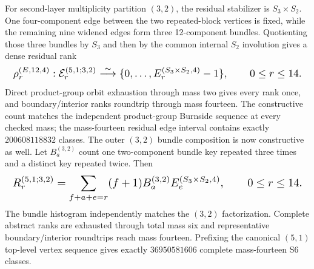 \documentclass{article}
\newcommand{\fitmath}[1]{\resizebox{0.99\linewidth}{!}{$\displaystyle #1$}}
\begin{document}
For second-layer multiplicity partition $(3,2)$, the residual stabilizer is
$S_3\times S_2$. One four-component edge between the two repeated-block
vertices is fixed, while the remaining nine widened edges form three
12-component bundles. Quotienting those three bundles by $S_3$ and then by the
common internal $S_2$ involution gives a dense residual rank
\begin{equation}
  \fitmath{%
    \rho^{(E,12,4)}_r:
      \mathcal E^{(5,1;3,2)}_r
      \overset{\sim}{\longrightarrow}
      \{0,\ldots,E_r^{(S_3\times S_2,4)}-1\},
    \qquad 0\leq r\leq14.
  }
  \label{eq:optimization-crazy-sextuple-s6-s5-s3s2-edge-ranking}
\end{equation}
Direct product-group orbit exhaustion through mass two gives every rank once,
and boundary/interior ranks roundtrip through mass fourteen. The constructive
count matches the independent product-group Burnside sequence at every checked
mass; the mass-fourteen residual edge interval contains exactly $200608118832$
classes. The outer $(3,2)$ bundle composition is now constructive as well.
Let $B_a^{(3,2)}$ count one two-component bundle key repeated three times and a
distinct key repeated twice. Then
\begin{equation}
  \fitmath{%
    R_r^{(5,1;3,2)}=
      \sum_{f+a+e=r}(f+1)B_a^{(3,2)}E_e^{(S_3\times S_2,4)},
    \qquad 0\leq r\leq14.
  }
  \label{eq:optimization-crazy-sextuple-s6-s5-s3s2-bundle-ranking}
\end{equation}
The bundle histogram independently matches the $(3,2)$ factorization. Complete
abstract ranks are exhausted through total mass six and representative
boundary/interior roundtrips reach mass fourteen. Prefixing the canonical
$(5,1)$ top-level vertex sequence gives exactly $36950581606$ complete
mass-fourteen S6 classes.
\end{document}
